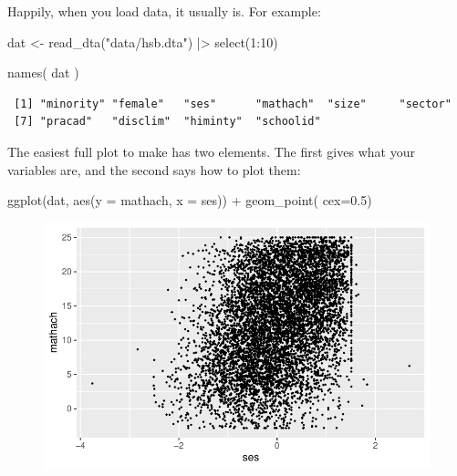 \documentclass[
  letterpaper,
  DIV=11,
  numbers=noendperiod]{scrreprt}
\newenvironment{Shaded}{\begin{snugshade}}{\end{snugshade}}
\newcommand{\AttributeTok}[1]{\textcolor[rgb]{0.49,0.56,0.16}{#1}}
\newcommand{\DecValTok}[1]{\textcolor[rgb]{0.25,0.63,0.44}{#1}}
\newcommand{\FloatTok}[1]{\textcolor[rgb]{0.25,0.63,0.44}{#1}}
\newcommand{\FunctionTok}[1]{\textcolor[rgb]{0.02,0.16,0.49}{#1}}
\newcommand{\NormalTok}[1]{\textcolor[rgb]{0.00,0.44,0.13}{#1}}
\newcommand{\OtherTok}[1]{\textcolor[rgb]{0.00,0.44,0.13}{#1}}
\newcommand{\SpecialCharTok}[1]{\textcolor[rgb]{0.25,0.44,0.63}{#1}}
\newcommand{\StringTok}[1]{\textcolor[rgb]{0.25,0.44,0.63}{#1}}
\begin{document}
Happily, when you load data, it usually is. For example:

\begin{Shaded}
\begin{Highlighting}[]
\NormalTok{dat }\OtherTok{\textless{}{-}} \FunctionTok{read\_dta}\NormalTok{(}\StringTok{"data/hsb.dta"}\NormalTok{) }\SpecialCharTok{|\textgreater{}} 
  \FunctionTok{select}\NormalTok{(}\DecValTok{1}\SpecialCharTok{:}\DecValTok{10}\NormalTok{)}

\FunctionTok{names}\NormalTok{( dat )}
\end{Highlighting}
\end{Shaded}

\begin{verbatim}
 [1] "minority" "female"   "ses"      "mathach"  "size"     "sector"  
 [7] "pracad"   "disclim"  "himinty"  "schoolid"
\end{verbatim}

The easiest full plot to make has two elements. The first gives what
your variables are, and the second says how to plot them:

\begin{Shaded}
\begin{Highlighting}[]
\FunctionTok{ggplot}\NormalTok{(dat, }\FunctionTok{aes}\NormalTok{(}\AttributeTok{y =}\NormalTok{ mathach, }\AttributeTok{x =}\NormalTok{ ses)) }\SpecialCharTok{+} 
  \FunctionTok{geom\_point}\NormalTok{( }\AttributeTok{cex=}\FloatTok{0.5}\NormalTok{)}
\end{Highlighting}
\end{Shaded}

\begin{figure}[H]

{\centering \includegraphics{intro_ggplot_files/figure-pdf/unnamed-chunk-2-1.pdf}

}

\end{figure}
\end{document}
